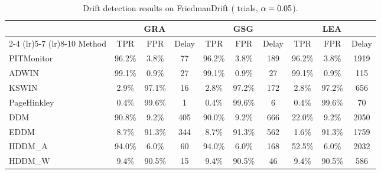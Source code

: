 \begin{table}[t]
\centering
\small
\caption{Drift detection results on FriedmanDrift (\expNtrials{} trials, $\alpha=0.05$).}
\label{tab:results}
\begin{tabular}{l ccc ccc ccc}
\toprule
\multicolumn{1}{l}{} & \multicolumn{3}{c}{GRA} & \multicolumn{3}{c}{GSG} & \multicolumn{3}{c}{LEA} \\
\cmidrule(lr){2-4} \cmidrule(lr){5-7} \cmidrule(lr){8-10}
Method & TPR & FPR & Delay & TPR & FPR & Delay & TPR & FPR & Delay \\
\midrule
PITMonitor & 96.2\% & 3.8\% & 77 & 96.2\% & 3.8\% & 189 & 96.2\% & 3.8\% & 1919 \\
ADWIN & 99.1\% & 0.9\% & 27 & 99.1\% & 0.9\% & 27 & 99.1\% & 0.9\% & 115 \\
KSWIN & 2.9\% & 97.1\% & 16 & 2.8\% & 97.2\% & 172 & 2.8\% & 97.2\% & 656 \\
PageHinkley & 0.4\% & 99.6\% & 1 & 0.4\% & 99.6\% & 6 & 0.4\% & 99.6\% & 70 \\
DDM & 90.8\% & 9.2\% & 405 & 90.0\% & 9.2\% & 666 & 22.0\% & 9.2\% & 2050 \\
EDDM & 8.7\% & 91.3\% & 344 & 8.7\% & 91.3\% & 562 & 1.6\% & 91.3\% & 1759 \\
HDDM\_A & 94.0\% & 6.0\% & 60 & 94.0\% & 6.0\% & 168 & 52.5\% & 6.0\% & 2032 \\
HDDM\_W & 9.4\% & 90.5\% & 15 & 9.4\% & 90.5\% & 46 & 9.4\% & 90.5\% & 586 \\
\bottomrule
\end{tabular}
\end{table}